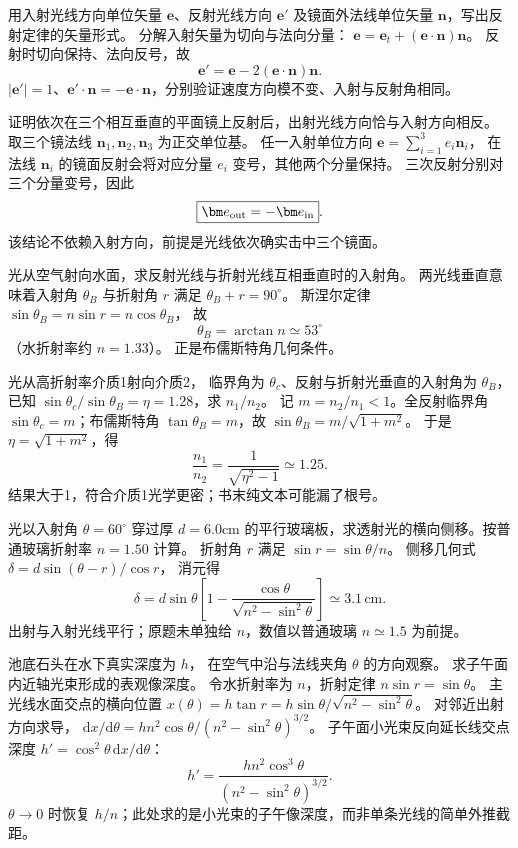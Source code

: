 用入射光线方向单位矢量 $\bm e$、反射光线方向 $\bm e'$ 及镜面外法线单位矢量 $\bm n$，写出反射定律的矢量形式。
\exsolution
分解入射矢量为切向与法向分量：
$\bm e=\bm e_t+(\bm e\cdot\bm n)\bm n$。
反射时切向保持、法向反号，故
\[
\boxed{\bm e'=\bm e-2(\bm e\cdot\bm n)\bm n}.
\]
\excheck $|\bm e'|=1$、$\bm e'\cdot\bm n=-\bm e\cdot\bm n$，分别验证速度方向模不变、入射与反射角相同。

证明依次在三个相互垂直的平面镜上反射后，出射光线方向恰与入射方向相反。
\exsolution
取三个镜法线 $\bm n_1,\bm n_2,\bm n_3$ 为正交单位基。
任一入射单位方向
$\bm e=\sum_{i=1}^3 e_i\bm n_i$，
在法线 $\bm n_i$ 的镜面反射会将对应分量 $e_i$ 变号，其他两个分量保持。
三次反射分别对三个分量变号，因此
\[
\boxed{\bm e_{\rm out}=-\bm e_{\rm in}}.
\]
\excheck 该结论不依赖入射方向，前提是光线依次确实击中三个镜面。

光从空气射向水面，求反射光线与折射光线互相垂直时的入射角。
\exsolution
两光线垂直意味着入射角 $\theta_B$ 与折射角 $r$ 满足
$\theta_B+r=90^\circ$。
斯涅尔定律
$\sin\theta_B=n\sin r=n\cos\theta_B$，
故
\[
\boxed{\theta_B=\arctan n\simeq53^\circ}
\]
（水折射率约 $n=1.33$）。
\excheck 正是布儒斯特角几何条件。

光从高折射率介质1射向介质2，
临界角为 $\theta_c$、反射与折射光垂直的入射角为 $\theta_B$，
已知 $\sin\theta_c/\sin\theta_B=\eta=1.28$，求 $n_1/n_2$。
\exsolution
记 $m=n_2/n_1<1$。全反射临界角
$\sin\theta_c=m$；布儒斯特角
$\tan\theta_B=m$，故
$\sin\theta_B=m/\sqrt{1+m^2}$。
于是 $\eta=\sqrt{1+m^2}$，得
\[
\boxed{\frac{n_1}{n_2}=\frac1{\sqrt{\eta^2-1}}
\simeq1.25}.
\]
\excheck 结果大于1，符合介质1光学更密；书末纯文本可能漏了根号。

光以入射角 $\theta=60^\circ$ 穿过厚
$d=6.0$cm 的平行玻璃板，求透射光的横向侧移。按普通玻璃折射率 $n=1.50$ 计算。
\exsolution
折射角 $r$ 满足 $\sin r=\sin\theta/n$。
侧移几何式
$\delta=d\sin(\theta-r)/\cos r$，
消元得
\[
\boxed{\delta=d\sin\theta
\left[1-\frac{\cos\theta}{\sqrt{n^2-\sin^2\theta}}\right]
\simeq3.1\,\mathrm{cm}}.
\]
\excheck 出射与入射光线平行；原题未单独给 $n$，数值以普通玻璃 $n\simeq1.5$ 为前提。

池底石头在水下真实深度为 $h$，
在空气中沿与法线夹角 $\theta$ 的方向观察。
求子午面内近轴光束形成的表观像深度。
\exsolution
令水折射率为 $n$，折射定律
$n\sin r=\sin\theta$。
主光线水面交点的横向位置
$x(\theta)=h\tan r=h\sin\theta/\sqrt{n^2-\sin^2\theta}$。
对邻近出射方向求导，
$\mathrm dx/\mathrm d\theta
=hn^2\cos\theta/(n^2-\sin^2\theta)^{3/2}$。
子午面小光束反向延长线交点深度
$h'=\cos^2\theta\,\mathrm dx/\mathrm d\theta$：
\[
\boxed{h'=\frac{hn^2\cos^3\theta}
{(n^2-\sin^2\theta)^{3/2}}}.
\]
\excheck $\theta\to0$ 时恢复 $h/n$；此处求的是小光束的子午像深度，而非单条光线的简单外推截距。

